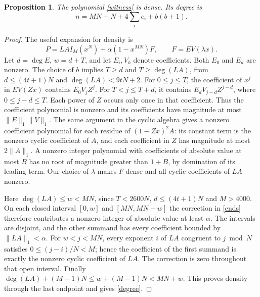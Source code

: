 \documentclass[10pt,a4paper,reqno]{amsart}
\newtheorem{proposition}[theorem]{Proposition}
\begin{document}
\begin{proposition}\label{dense}
The polynomial \eqref{witness} is dense. Its degree is
\begin{equation}\label{degree}
                n=MN+N+4\sum_i e_i+b(b+1).
\end{equation}
\end{proposition}
\begin{proof}
The useful expansion for density is
\begin{equation}\label{ends}
        P=LA I_M(x^N)+\alpha(1-x^{MN})F,\qquad F=EV(\lambda x).
\end{equation}
Let $d=\deg E$, $w=d+T$, and let $E_i,V_k$ denote coefficients. Both $E_0$ and $E_d$ are nonzero. The choice of $b$ implies $T\ge d$ and $T\ge\deg(LA)$, from $d\le(4t+1)N$ and $\deg(LA)<9tN+2$. For $0\le j\le T$, the coefficient of $x^j$ in $EV(Zx)$ contains $E_0 V_jZ^j$. For $T<j\le T+d$, it contains $E_dV_{j-d} Z^{j-d}$, where $0\le j-d\le T$. Each power of $Z$ occurs only once in that coefficient. Thus the coefficient polynomial is nonzero and its coefficients have magnitude at most $\|E\|_1\|V\|_1$. The same argument in the cyclic algebra gives a nonzero coefficient polynomial for each residue of $(1-Zx)^2A$: its constant term is the nonzero cyclic coefficient of $A$, and each coefficient in $Z$ has magnitude at most $2\|A\|_1$. A nonzero integer polynomial with coefficients of absolute value at most $B$ has no root of magnitude greater than $1+B$, by domination of its leading term. Our choice of $\lambda$ makes $F$ dense and all cyclic coefficients of $LA$ nonzero.

Here $\deg(LA)\le w<MN$, since $T<2600N$, $d\le(4t+1)N$ and $M>4000$. On each closed interval $[0,w]$ and $[MN,MN+w]$ the correction in \eqref{ends} therefore contributes a nonzero integer of absolute value at least $\alpha$. The intervals are disjoint, and the other summand has every coefficient bounded by $\|LA\|_1<\alpha$. For $w<j<MN$, every exponent $i$ of $LA$ congruent to $j\bmod N$ satisfies $0\le(j-i)/N<M$; hence the coefficient of the first summand is exactly the nonzero cyclic coefficient of $LA$. The correction is zero throughout that open interval. Finally $\deg(LA)+(M-1)N\le w+(M-1)N<MN+w$. This proves density through the last endpoint and gives \eqref{degree}.
\end{proof}
\end{document}
